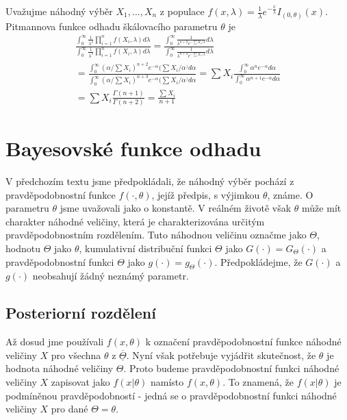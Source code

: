 \begin{example}
Uvažujme náhodný výběr $X_1, ..., X_n$ z populace $f(x, \lambda) = \frac{1}{\lambda}e^{-\frac{x}{\lambda}}I_{(0, \theta)}(x)$. Pitmannova funkce odhadu škálovacího parametru $\theta$ je
\begin{gather*}
\frac{\int_0^{\infty}\frac{1}{\lambda^2}\prod_{i = 1}^n f(X_i, \lambda) d \lambda}{\int_0^{\infty}\frac{1}{\lambda^3}\prod_{i = 1}^n f(X_i, \lambda) d \lambda} = \frac{\int_0^{\infty}\frac{1}{\lambda^{n + 2}e^{-\sum X_i/\lambda}}d \lambda}{\int_0^{\infty}\frac{1}{\lambda^{n + 3}e^{-\sum X_i/\lambda}}d \lambda}\\
= \frac{\int_0^{\infty}(\alpha / \sum X_i)^{n + 2}e^{-\alpha}(\sum X_i/\alpha^)d \alpha}{\int_0^{\infty}(\alpha / \sum X_i)^{n + 3}e^{-\alpha}(\sum X_i/\alpha^)d \alpha} = \sum X_i \frac{\int_0^{\infty} \alpha^n e^{-\alpha}d \alpha}{\int_0^{\infty}\alpha^{n + 1}e^{-\alpha}d \alpha}\\
= \sum X_i \frac{\Gamma(n+1)}{\Gamma(n + 2)} = \frac{\sum X_i}{n + 1}
\end{gather*}
\end{example}

\section{Bayesovské funkce odhadu}

V předchozím textu jsme předpokládali, že náhodný výběr pochází z pravděpodobnostní funkce $f(\cdot, \theta)$, jejíž předpis, s výjimkou $\theta$, známe. O parametru $\theta$ jsme uvažovali jako o konstantě. V reálném životě však $\theta$ může mít charakter náhodné veličiny, která je charakterizována určitým pravděpodobnostním rozdělením. Tuto náhodnou veličinu označme jako $\Theta$, hodnotu $\Theta$ jako $\theta$, kumulativní distribuční funkci $\Theta$ jako $G(\cdot) = G_{\Theta}(\cdot)$ a pravděpodobnostní funkci $\Theta$ jako $g(\cdot) = g_{\Theta}(\cdot)$. Předpokládejme, že $G(\cdot)$ a $g(\cdot)$ neobsahují žádný neznámý parametr.

\subsection{Posteriorní rozdělení}

Až dosud jme používali $f(x, \theta)$ k označení pravděpodobnostní funkce náhodné veličiny $X$ pro všechna $\theta$ z $\overline{\underline{\Theta}}$. Nyní však potřebuje vyjádřit skutečnost, že $\theta$ je hodnota náhodné veličiny $\Theta$. Proto budeme pravděpodobnostní funkci náhodné veličiny $X$ zapisovat jako $f(x|\theta)$ namísto $f(x, \theta)$. To znamená, že $f(x|\theta)$ je podmíněnou pravděpodobností - jedná se o pravděpodobnostní funkci náhodné veličiny $X$ pro dané $\Theta = \theta$.

